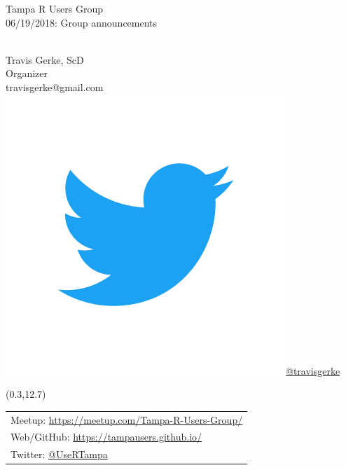 \documentclass{beamer}
\begin{document}
\begin{frame}
\vspace{4cm}
\begin{center}
\normalsize{Tampa R Users Group}\\
\normalsize{06/19/2018: Group announcements}\\
\vspace{.2cm}~
\vspace{1cm}
\end{center}

\vspace{.2cm}
\begin{flushright}
\scriptsize{Travis Gerke, ScD}\\
\tiny{Organizer}\\
\tiny{travisgerke@gmail.com}\\
\includegraphics[scale=.02, trim=0 1cm 0 3.5cm, clip]{figures/Twitter_Logo_Blue.png}\tiny{\href{https://twitter.com/travisgerke}{@travisgerke}}\\
\vspace{.11cm}
\end{flushright}

\begin{textblock}{6}(0.3,12.7)
\scriptsize{
\begin{table}[h]
\centering
\begin{tabular}{l}
Meetup: \href{https://meetup.com/Tampa-R-Users-Group/}{https://meetup.com/Tampa-R-Users-Group/}\\
Web/GitHub: \href{https://tampausers.github.io/}{https://tampausers.github.io/}\\
Twitter: \href{https://twitter.com/usertampa}{@UseRTampa}\\
\end{tabular}
\end{table}
}
\end{textblock}


\end{frame}
\end{document}
